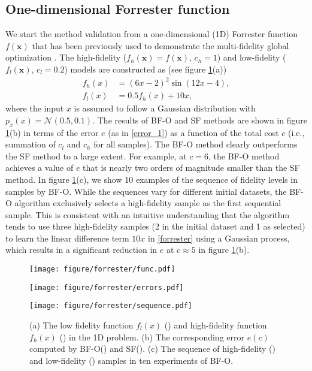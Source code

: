 \documentclass[11pt]{article}
\begin{document}
\subsection{One-dimensional Forrester function}
We start the method validation from a one-dimensional (1D) Forrester function $f(\mathbf{x})$ that has been previously used to demonstrate the multi-fidelity global optimization \cite{forrester2007multi}. The high-fidelity ($f_h(\mathbf{x})=f(\mathbf{x})$, $c_h=1$) and low-fidelity ($f_l(\mathbf{x})$, $c_l=0.2$) models are constructed as (see figure \ref{fig:forrester_linear}(a)) 
\begin{align}
    f_h(x) & = (6x - 2)^2 \sin(12x - 4), \\
    f_l(x) & = 0.5 f_h(x) + 10x,
\label{forrester}
\end{align}
where the input $x$ is assumed to follow a Gaussian distribution with $p_{x}(x) = \mathcal{N}(0.5, 0.1)$. The results of BF-O and SF methods are shown in figure \ref{fig:forrester_linear}(b) in terms of the error $e$ (as in \eqref{error_1}) as a function of the total cost $c$ (i.e., summation of $c_l$ and $c_h$ for all samples). The BF-O method clearly outperforms the SF method to a large extent. For example, at $c=6$, the BF-O method achieves a value of $e$ that is nearly two orders of magnitude smaller than the SF method. In figure \ref{fig:forrester_linear}(c), we show 10 examples of the sequence of fidelity levels in samples by BF-O. While the sequences vary for different initial datasets, the BF-O algorithm exclusively selects a high-fidelity sample as the first sequential sample. This is consistent with an intuitive understanding that the algorithm tends to use three high-fidelity samples (2 in the initial dataset and 1 as selected) to learn the linear difference term $10x$ in \eqref{forrester} using a Gaussian process, which results in a significant reduction in $e$ at $c\approx 5$ in figure \ref{fig:forrester_linear}(b). 

\begin{figure}
\centering
\begin{minipage}[b]{0.34\linewidth}
\texttt{[image: figure/forrester/func.pdf]}
\end{minipage}
\begin{minipage}[b]{0.34\linewidth}
\texttt{[image: figure/forrester/errors.pdf]}
\end{minipage}
\begin{minipage}[b]{0.29\linewidth}
\texttt{[image: figure/forrester/sequence.pdf]}
\end{minipage}
\caption{(a) The low fidelity function $f_l(x)$ (\redline) and high-fidelity function $f_h(x)$ (\blackline) in the 1D problem. (b) The corresponding error $e(c)$ computed by BF-O(\blackline) and SF(\blueline). (c) The sequence of high-fidelity () and low-fidelity () samples in ten experiments of BF-O.}
\label{fig:forrester_linear}
\end{figure}
\end{document}
